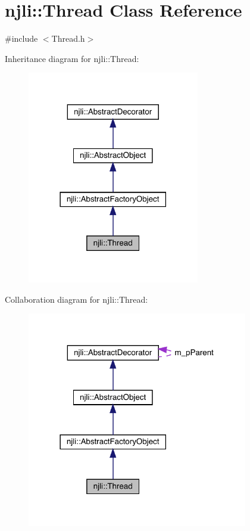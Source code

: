 \hypertarget{classnjli_1_1_thread}{}\section{njli\+:\+:Thread Class Reference}
\label{classnjli_1_1_thread}


{\ttfamily \#include $<$Thread.\+h$>$}



Inheritance diagram for njli\+:\+:Thread\+:\nopagebreak
\begin{figure}[H]
\begin{center}
\leavevmode
\includegraphics[width=213pt]{classnjli_1_1_thread__inherit__graph}
\end{center}
\end{figure}


Collaboration diagram for njli\+:\+:Thread\+:\nopagebreak
\begin{figure}[H]
\begin{center}
\leavevmode
\includegraphics[width=273pt]{classnjli_1_1_thread__coll__graph}
\end{center}
\end{figure}
